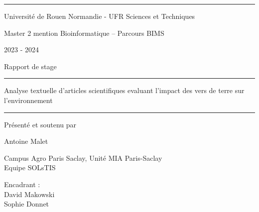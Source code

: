 \documentclass{book}
\begin{document}
\vspace{0.5cm}
\hrule
\vspace{0.5cm}

\begin{center}
    \large{Université de Rouen Normandie - UFR Sciences et Techniques}
\end{center}

\begin{center}
    \large{Master 2 mention Bioinformatique – Parcours BIMS}
\end{center}

\begin{center}
    \large{2023 - 2024}
\end{center}

\vspace{1cm}

\begin{center}
    \Large{Rapport de stage}
\end{center}

\begin{center}
    \vspace{1cm}
    \hrule
    \vspace{1cm}
    \huge{Analyse textuelle d'articles scientifiques evaluant l’impact des vers
        de terre sur l’environnement}
    \vspace{1cm}
    \hrule
    \vspace{1cm}
\end{center}

\begin{center}
    \large{Présenté et soutenu par}
\end{center}

\begin{center}
    \huge{Antoine Malet}
\end{center}

\begin{center}
    \vspace{1.5cm}
    \Large{Campus Agro Paris Saclay, Unité MIA Paris-Saclay} \\
    \Large{Equipe SOLsTIS}
\end{center}

\begin{center}
    \vspace{0.5cm}
    \large{Encadrant :} \\
    \vspace{0.5cm}
    \large{David Makowski} \\
    \large{Sophie Donnet}
\end{center}
\end{document}
